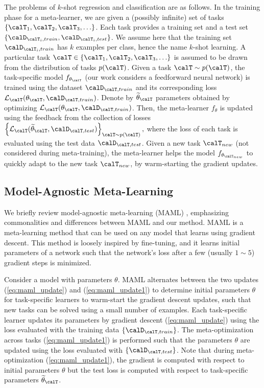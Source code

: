 \documentclass{article}
\newcommand{\loss}{\mathcal{L}_{\calT}}
\begin{document}
The problems of $k$-shot regression and classification are as follows.
In the training phase for a meta-learner, we are given a (possibly infinite) set of tasks $\{\calT_1,\calT_2, \calT_3, \ldots\}$.
Each task provides a training set and a test set $\left\{\calD_{\calT_i,train},\calD_{\calT_i,test}\right\}$.
We assume here that the training set $\calD_{\calT_i,train}$ has $k$ examples per class, hence the name $k$-shot learning.
A particular task $\calT \in \{\calT_1,\calT_2, \calT_3, \ldots\}$ is assumed to be drawn from the distribution of tasks $p(\calT)$.
Given a task $\calT \sim p(\calT)$, the task-specific model $f_{\theta_\calT}$ (our work considers a feedforward neural network)
is trained using the dataset $\calD_{\calT,train}$ and 
its corresponding loss $\loss (\theta_\calT,\calD_{\calT,train})$. 
Denote by $\widetilde{\theta}_\calT$ parameters obtained by optimizing $\loss (\theta_\calT,\calD_{\calT,train})$.
Then, the meta-learner $f_{\theta}$ is updated using the feedback from the collection of losses
$\left\{\loss (\widetilde{\theta}_\calT,\calD_{\calT,test}) \right\}_{\calT \sim p(\calT)},$
where the loss of each task is evaluated using the test data $\calD_{\calT,test}$.
Given a new task $\calT_{new}$ (not considered during meta-training),
the meta-learner helps the model $f_{\theta_{\calT_{new}}}$ to quickly adapt to the new task $\calT_{new}$,
by warm-starting the gradient updates.

\subsection{Model-Agnostic Meta-Learning}
We briefly review model-agnostic meta-learning (MAML) \cite{FinnC2017icml}, emphasizing commonalities and differences between MAML and our method.
MAML is a meta-learning method that can be used on any model that learns using gradient descent. 
This method is loosely inspired by fine-tuning, and it learns initial parameters of a network such that the network's loss after a few (usually $1 \sim 5$) gradient steps is minimized.

Consider a model with parameters $\theta$.
MAML alternates between the two updates (\ref{eq:maml_update}) and (\ref{eq:maml_update1})
to determine initial parameters $\theta$ 
for task-specific learners to warm-start the gradient descent updates,
such that new tasks can be solved using a small number of examples.
Each task-specific learner updates its parameters by gradient descent (\ref{eq:maml_update}) 
using the loss evaluated with the training data $\{\calD_{\calT,train}\}$. 
The meta-optimization across tasks (\ref{eq:maml_update1}) is performed such that the parameters $\theta$ are updated
using the loss evaluated with $\{\calD_{\calT,test}\}$.
Note that during meta-optimization (\ref{eq:maml_update1}), the gradient is computed with respect to initial parameters $ \theta $ but the test loss is computed with respect to task-specific parameters $ \widetilde{\theta}_{\calT} $.
\end{document}
